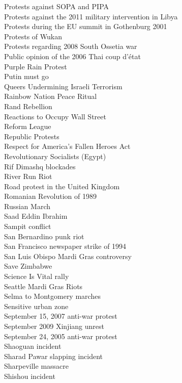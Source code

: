 Protests against SOPA and PIPA\\
Protests against the 2011 military intervention in Libya\\
Protests during the EU summit in Gothenburg 2001\\
Protests of Wukan\\
Protests regarding 2008 South Ossetia war\\
Public opinion of the 2006 Thai coup d'état\\
Purple Rain Protest\\
Putin must go\\
Queers Undermining Israeli Terrorism\\
Rainbow Nation Peace Ritual\\
Rand Rebellion\\
Reactions to Occupy Wall Street\\
Reform League\\
Republic Protests\\
Respect for America's Fallen Heroes Act\\
Revolutionary Socialists (Egypt)\\
Rif Dimashq blockades\\
River Run Riot\\
Road protest in the United Kingdom\\
Romanian Revolution of 1989\\
Russian March\\
Saad Eddin Ibrahim\\
Sampit conflict\\
San Bernardino punk riot\\
San Francisco newspaper strike of 1994\\
San Luis Obispo Mardi Gras controversy\\
Save Zimbabwe\\
Science Is Vital rally\\
Seattle Mardi Gras Riots\\
Selma to Montgomery marches\\
Sensitive urban zone\\
September 15, 2007 anti-war protest\\
September 2009 Xinjiang unrest\\
September 24, 2005 anti-war protest\\
Shaoguan incident\\
Sharad Pawar slapping incident\\
Sharpeville massacre\\
Shishou incident\\
